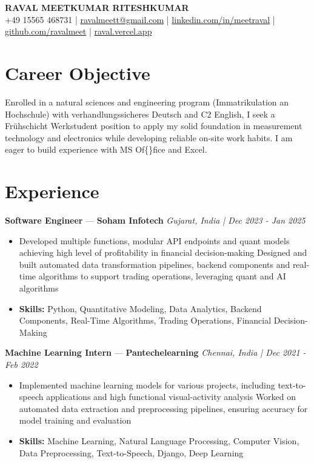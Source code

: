 \documentclass[a4paper,10pt]{article}
\begin{document}
\begin{center}
  {\Large\bfseries RAVAL MEETKUMAR RITESHKUMAR}\\[2pt]
  {\small +49 15565 468731 \;|\; \href{mailto:ravalmeett@gmail.com}{ravalmeett@gmail.com} \;|\; \href{https://www.linkedin.com/in/meetraval/}{linkedin.com/in/meetraval} \;|\; \href{https://github.com/ravalmeet}{github.com/ravalmeet} \;|\; \href{https://raval.vercel.app/}{raval.vercel.app}}
\end{center}
\vspace{-3pt}

\section*{Career Objective}
Enrolled in a natural sciences and engineering program (Immatrikulation an Hochschule) with verhandlungssicheres Deutsch and C2 English, I seek a Frühschicht Werkstudent position to apply my solid foundation in measurement technology and electronics while developing reliable on-site work habits. I am eager to build experience with MS Of\{\}fice and Excel.\par

\section*{Experience}
\textbf{Software Engineer} — \textbf{Soham Infotech} \hfill \textit{Gujarat, India \;|\; Dec 2023 - Jan 2025}\par
\vspace{1pt}
\begin{itemize}
  \item Developed multiple functions, modular API endpoints and quant models achieving high level of profitability in financial decision-making Designed and built automated data transformation pipelines, backend components and real-time algorithms to support trading operations, leveraging quant and AI algorithms
  \item \textbf{Skills:} Python, Quantitative Modeling, Data Analytics, Backend Components, Real-Time Algorithms, Trading Operations, Financial Decision-Making
\end{itemize}
\vspace{3pt}
\textbf{Machine Learning Intern} — \textbf{Pantechelearning} \hfill \textit{Chennai, India \;|\; Dec 2021 - Feb 2022}\par
\vspace{1pt}
\begin{itemize}
  \item Implemented machine learning models for various projects, including text-to-speech applications and high functional visual-activity analysis Worked on automated data extraction and preprocessing pipelines, ensuring accuracy for model training and evaluation
  \item \textbf{Skills:} Machine Learning, Natural Language Processing, Computer Vision, Data Preprocessing, Text-to-Speech, Django, Deep Learning
\end{itemize}
\end{document}
